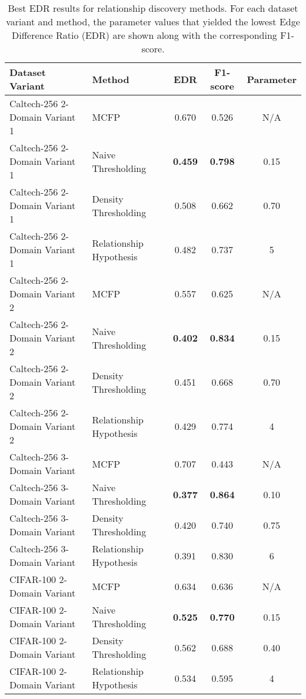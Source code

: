 \begin{table}[ht]
\centering
\caption{Best EDR results for relationship discovery methods. For each dataset variant and method, the parameter values that yielded the lowest Edge Difference Ratio (EDR) are shown along with the corresponding F1-score.}
\label{tab:relationship_methods_best_edr}
\begin{tabular}{llccc}
\toprule
Dataset Variant & Method & EDR & F1-score & Parameter \\
\midrule
Caltech-256 2-Domain Variant 1 & MCFP & 0.670 & 0.526 & N/A \\
Caltech-256 2-Domain Variant 1 & Naive Thresholding & \textbf{0.459} & \textbf{0.798} & 0.15 \\
Caltech-256 2-Domain Variant 1 & Density Thresholding & 0.508 & 0.662 & 0.70 \\
Caltech-256 2-Domain Variant 1 & Relationship Hypothesis & 0.482 & 0.737 & 5 \\
\hline
Caltech-256 2-Domain Variant 2 & MCFP & 0.557 & 0.625 & N/A \\
Caltech-256 2-Domain Variant 2 & Naive Thresholding & \textbf{0.402} & \textbf{0.834} & 0.15 \\
Caltech-256 2-Domain Variant 2 & Density Thresholding & 0.451 & 0.668 & 0.70 \\
Caltech-256 2-Domain Variant 2 & Relationship Hypothesis & 0.429 & 0.774 & 4 \\
\hline
Caltech-256 3-Domain Variant & MCFP & 0.707 & 0.443 & N/A \\
Caltech-256 3-Domain Variant & Naive Thresholding & \textbf{0.377} & \textbf{0.864} & 0.10 \\
Caltech-256 3-Domain Variant & Density Thresholding & 0.420 & 0.740 & 0.75 \\
Caltech-256 3-Domain Variant & Relationship Hypothesis & 0.391 & 0.830 & 6 \\
\hline
CIFAR-100 2-Domain Variant & MCFP & 0.634 & 0.636 & N/A \\
CIFAR-100 2-Domain Variant & Naive Thresholding & \textbf{0.525} & \textbf{0.770} & 0.15 \\
CIFAR-100 2-Domain Variant & Density Thresholding & 0.562 & 0.688 & 0.40 \\
CIFAR-100 2-Domain Variant & Relationship Hypothesis & 0.534 & 0.595 & 4 \\
\bottomrule
\end{tabular}
\end{table}
